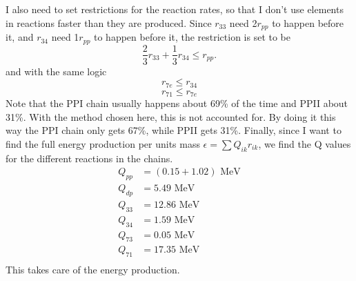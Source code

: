 \documentclass[a4paper,12pt]{article}
\begin{document}
I also need to set restrictions for the reaction rates, so that I don't use elements in reactions faster than they are produced.
Since $r_{33}$ need 2$r_{pp}$ to happen before it, and $r_{34}$ need 1$r_{pp}$ to happen before it, the restriction is set to be
\begin{equation}
 \frac{2}{3}r_{33} + \frac{1}{3}r_{34} \le r_{pp}.
\end{equation}
and with the same logic
\begin{equation}
r_{7e} \le r_{34}
\end{equation}
\begin{equation}
r_{71} \le r_{7e}
\end{equation}
Note that the PPI chain usually happens about 69\% of the time and PPII about 31\%. With the method chosen here, this is not accounted for. By doing it this way the PPI chain only gets 67\%, while PPII gets 31\%. 
Finally, since I want to find the full energy production per units mass $\epsilon = \sum Q_{ik} r_{ik}$, we find the Q values for the different reactions in the chains.
\begin{equation}
\begin{aligned}
Q_{pp}  &= (0.15+1.02) \textrm{ MeV}\\
Q_{dp}  &= 5.49 \textrm{ MeV}\\
Q_{33}  &= 12.86 \textrm{ MeV}\\
Q_{34}  &= 1.59 \textrm{ MeV}\\
Q_{73}  &= 0.05 \textrm{ MeV}\\
Q_{71}  &= 17.35 \textrm{ MeV}\\
\end{aligned}
\end{equation}
This takes care of the energy production.
\end{document}
